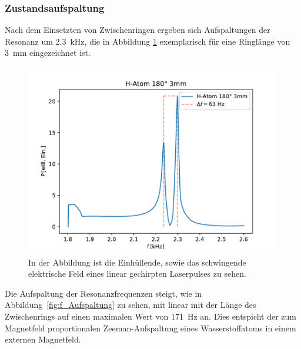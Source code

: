         \FloatBarrier
        \newpage
        \subsubsection*{Zustandsaufspaltung}
            Nach dem Einsetzten von Zwischenringen ergeben sich Aufspaltungen der Resonanz um \SI{2.3}{\kilo\hertz}, die in Abbildung \ref{fig:hatom_180_3mm} exemplarisch für eine Ringlänge von 
            \SI{3}{\milli\metre} eingezeichnet ist.
            \FloatBarrier 
            \begin{figure}[ht]
                \centering
                \includegraphics[scale=0.5]{./pictures/hatom_180_3mm.pdf}
                \caption{In der Abbildung ist die Einhüllende, sowie das schwingende elektrische Feld eines linear gechirpten Laserpulses zu sehen.}
                \label{fig:hatom_180_3mm}
            \end{figure}
            \FloatBarrier
            Die Aufspaltung der Resonanzfrequenzen steigt, wie in Abbildung~\ref{fig:f_Aufspaltung} zu sehen, mit linear mit der Länge des Zwischenrings auf einen maximalen Wert von \SI{171}{\hertz} an.
            Dies entspicht der zum Magnetfeld proportionalen Zeeman-Aufspaltung eines Wasserstoffatoms in einem externen Magnetfeld.
            \FloatBarrier
